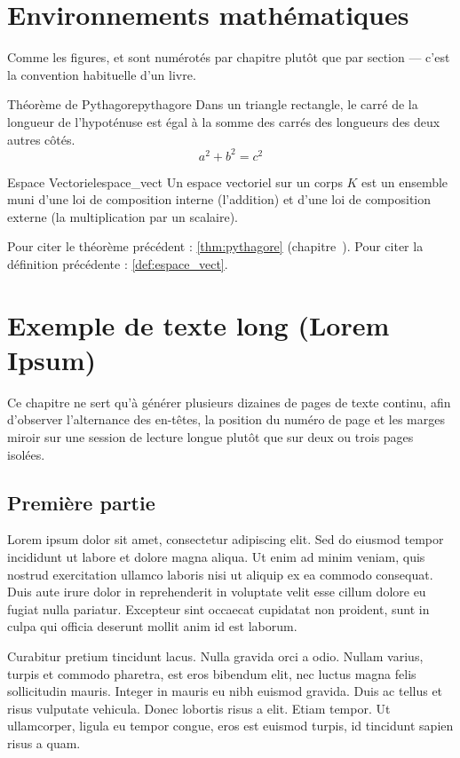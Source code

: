 \documentclass[theme=pringlea]{myrtillebook}
\begin{document}
\chapter{Environnements mathématiques}

Comme les figures,  et  sont numérotés par chapitre plutôt que par section — c'est la convention habituelle d'un livre.

\begin{myrthm}{Théorème de Pythagore}{pythagore}
Dans un triangle rectangle, le carré de la longueur de l'hypoténuse est égal à la somme des carrés des longueurs des deux autres côtés.
\[ a^2 + b^2 = c^2 \]
\end{myrthm}

\begin{myrdef}{Espace Vectoriel}{espace_vect}
Un espace vectoriel sur un corps $K$ est un ensemble muni d'une loi de composition interne (l'addition) et d'une loi de composition externe (la multiplication par un scalaire).
\end{myrdef}

Pour citer le théorème précédent : \ref{thm:pythagore} (chapitre~\thechapter). Pour citer la définition précédente : \ref{def:espace_vect}.

\chapter{Exemple de texte long (Lorem Ipsum)}

Ce chapitre ne sert qu'à générer plusieurs dizaines de pages de texte continu, afin d'observer l'alternance des en-têtes, la position du numéro de page et les marges miroir sur une session de lecture longue plutôt que sur deux ou trois pages isolées.

\section{Première partie}

Lorem ipsum dolor sit amet, consectetur adipiscing elit. Sed do eiusmod tempor incididunt ut labore et dolore magna aliqua. Ut enim ad minim veniam, quis nostrud exercitation ullamco laboris nisi ut aliquip ex ea commodo consequat. Duis aute irure dolor in reprehenderit in voluptate velit esse cillum dolore eu fugiat nulla pariatur. Excepteur sint occaecat cupidatat non proident, sunt in culpa qui officia deserunt mollit anim id est laborum.

Curabitur pretium tincidunt lacus. Nulla gravida orci a odio. Nullam varius, turpis et commodo pharetra, est eros bibendum elit, nec luctus magna felis sollicitudin mauris. Integer in mauris eu nibh euismod gravida. Duis ac tellus et risus vulputate vehicula. Donec lobortis risus a elit. Etiam tempor. Ut ullamcorper, ligula eu tempor congue, eros est euismod turpis, id tincidunt sapien risus a quam.
\end{document}
